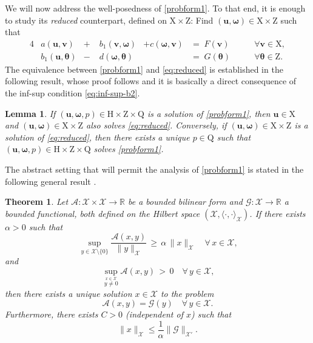 \documentclass[reqno,a4paper]{article}
\numberwithin{equation}{section}
\newcommand\bu{\boldsymbol{u}}
\newcommand\bv{\boldsymbol{v}}
\newcommand\R{\mathbb{R}}
\newcommand\disp{\displaystyle}
\renewcommand\H{\mathrm{H}}
\newcommand\Q{\mathrm{Q}}
\newcommand\Z{\mathrm{Z}}
\newcommand\X{\mathrm{X}}
\newcommand\bomega{\boldsymbol{\omega}}
\newcommand\btheta{\boldsymbol{\theta}}
\newtheorem{lemma}{Lemma}[section]
\newtheorem{theorem}{Theorem}[section]
\begin{document}
We will now address the well-posedness of \eqref{probform1}.
To that end, it is enough  to study its \emph{reduced} counterpart, defined 
on $\X\times \Z$: Find $(\bu,\bomega)\in \X\times \Z$ such that 
\begin{alignat}{4}
&a(\bu,\bv)      &+&\;b_{1}(\bv,\bomega)&+c(\bomega,\bv)&=\;
F(\bv)&\qquad\forall\bv\in\X,\nonumber\\
&b_{1}(\bu,\btheta)&-&\;d(\bomega,
\btheta)&&=\;G(\btheta)&\qquad\forall\btheta\in\Z\label{eq:reduced}.
\end{alignat}
The equivalence between \eqref{probform1} and 
\eqref{eq:reduced} is established in the following result, whose proof 
follows \cite{gr-1986} and it is basically a direct consequence of the inf-sup condition \eqref{eq:inf-sup-b2}.
%
\begin{lemma}\label{lemma:equivalence}
If $(\bu,\bomega,p)\in \H\times\Z\times\Q$ is a solution of \eqref{probform1},
then $\bu\in \X$ and $(\bu,\bomega)\in \X\times\Z$ also solves 
\eqref{eq:reduced}. Conversely,
if $(\bu,\bomega)\in \X\times\Z$ is a solution of \eqref{eq:reduced},
then there exists a unique $p\in\Q$ such that
$(\bu,\bomega,p)\in \H\times\Z\times\Q$ solves \eqref{probform1}.
\end{lemma}

The abstract setting that will permit the analysis of \eqref{probform1} is 
stated in the following general result \cite[Theorem 1.2]{G2014}.
%
\begin{theorem}\label{lemma:abc}
 Let 
$\mathcal A: \mathcal X\times \mathcal X \to \R$ be a bounded bilinear form and 
$\mathcal G: \mathcal X\to\R$ a bounded functional, both defined on the Hilbert space 
$(\mathcal X,\langle\cdot,\cdot\rangle_{\mathcal X})$.
If there exists $\alpha > 0$ such that
\begin{equation}\label{cont-inf-sup-A}
\disp\,\sup_{\scriptstyle y\in {\mathcal X}\setminus\{0\}}\frac{\mathcal A(x,y)}{\|y\|_{\mathcal X}}\,\ge\,\alpha\,\|x\|_{\mathcal X}
\quad\forall\,x\in \mathcal X,
\end{equation}
and
\begin{equation}\label{cont-inf-sup-B}
\disp\,\sup_{\stackrel{\scriptstyle x\in {\mathcal X}}{y\ne0}}\mathcal A(x,y)\,>\,0\quad\forall\,y\in \mathcal X,
\end{equation}
%
then there exists a unique solution $x \in \mathcal X$ to the problem 
\begin{equation*}
\mathcal A(x,y)= \mathcal G(y)\quad \forall\, y\in \mathcal X.
\end{equation*}
Furthermore, there exists $C>0$ (independent of $x$) such that 
$$\|x\|_{\mathcal X}\le \frac{1}{\alpha}\|\mathcal G\|_{\mathcal X'}.$$
\end{theorem}
\end{document}
